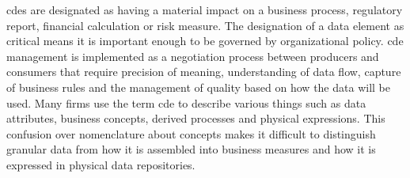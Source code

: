 %
%
\Glspl{cde} are designated as having a material impact on a business process, regulatory report,
financial calculation or risk measure.
The designation of a data element as critical means it is important enough to be governed by organizational policy.
\Gls{cde} management is implemented as a negotiation process between producers and consumers that require
precision of meaning, understanding of data flow, capture of business rules and the management of quality based on
how the data will be used.
Many firms use the term \gls{cde} to describe various things such as data attributes, business concepts,
derived processes and physical expressions.
This confusion over nomenclature about concepts makes it difficult to distinguish granular data from how it is
assembled into business measures and how it is expressed in physical data repositories.



